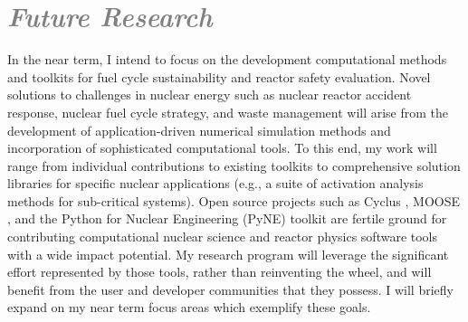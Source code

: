 \documentclass[a4paper, 10pt]{article}
\begin{document}
\section*{\textcolor{gray}{\it Future Research}}
In the near term, I intend to focus on the development computational methods and 
toolkits for fuel cycle sustainability and reactor safety evaluation.
Novel solutions to challenges in nuclear energy such as nuclear reactor accident 
response, nuclear fuel cycle strategy, and waste management will arise from the  
development of application-driven numerical simulation methods and incorporation 
of sophisticated computational tools. To this end, my work will range from 
individual contributions to existing toolkits to comprehensive solution 
libraries for specific nuclear applications (e.g., a suite of activation 
analysis methods for sub-critical systems). Open source projects such as 
Cyclus \cite{huff_cyclus_2011}, MOOSE \cite{gaston_moose:_2009}, and the Python 
for Nuclear Engineering (PyNE) toolkit \cite{pyne_pyne_2011} are fertile ground 
for contributing computational nuclear science and reactor physics software 
tools with a wide impact potential. My research program will leverage the 
significant effort represented by those tools, rather than reinventing the 
wheel, and will benefit from the user and developer communities that they 
possess.  I will briefly expand on my near term focus areas which 
exemplify these goals. 

%
\end{document}
